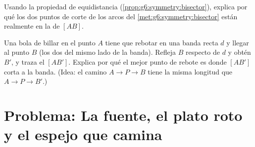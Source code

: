 \begin{exercise}[$\star\star$]\label{exo:g6:symmetry:11}
Usando la propiedad de equidistancia (\cref{prop:g6:symmetry:bisector}),
explica por qué los dos puntos de corte de los arcos del
\cref{met:g6:symmetry:bisector} están realmente en la 
de $[AB]$.
\end{exercise}

\begin{exercise}[$\star\star\star$]\label{exo:g6:symmetry:12}
Una bola de billar en el punto $A$ tiene que rebotar en una banda recta $d$ y
llegar al punto $B$ (los dos del mismo lado de la banda). Refleja $B$
respecto de $d$ y obtén $B'$, y traza el  $[AB']$. Explica por qué el
mejor punto de rebote es donde $[AB']$ corta a la banda. (Idea: el camino
$A \to P \to B$ tiene la misma longitud que $A \to P \to B'$.)
\end{exercise}

\section{Problema: La fuente, el plato roto y el espejo que
camina}

